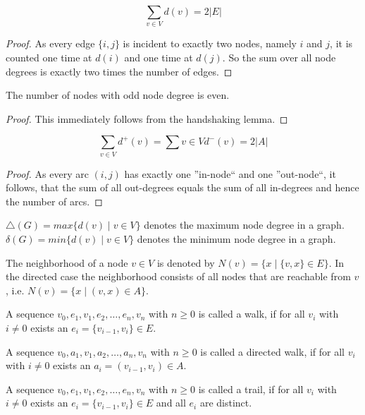 \begin{lemma}
$$\sum_{v \in V}d(v) = 2\left\vert{E}\right\vert$$
\end{lemma}
\begin{proof}
As every edge $\{i, j\}$ is incident to exactly two nodes, namely $i$ and $j$, it is
counted one time at $d(i)$ and one time at $d(j)$. So the sum over all node degrees
is exactly two times the number of edges.
\end{proof}
\begin{corollary}
The number of nodes with odd node degree is even.
\end{corollary}
\begin{proof}
This immediately follows from the handshaking lemma.
\end{proof}
\begin{lemma}
$$\sum_{v\in V}d^+(v)=\sum{v\in V}d^-(v)=2\left\vert{A}\right\vert$$
\end{lemma}
\begin{proof}
As every arc $(i, j)$ has exactly one ”in-node“ and one ”out-node“, it follows,
that the sum of all out-degrees equals the sum of all in-degrees and hence the
number of arcs.
\end{proof}
\begin{definition}
$\triangle (G) = max\{d(v) \mid v \in V \}$ denotes the maximum node degree in a graph. $\delta (G) = min\{d(v) \mid v \in V \}$ denotes the minimum node degree in a graph.
\end{definition}
\begin{definition}
The neighborhood of a node $v \in V$ is denoted by $N(v) = \{x \mid \{v, x\} \in E\}$. In the directed case the neighborhood consists of all nodes that are reachable from $v$, i.e. $N(v) = \{x \mid (v, x) \in A\}$.
\end{definition}
\begin{definition}[Walk]
A sequence $v_0,e_1,v_1,e_2,\ldots ,e_n,v_n$ with $n \geq 0$ is called
a walk, if for all $v_i$ with $i \neq 0$ exists an $e_i = \{v_{i-1} , v_i \} \in E$.
\end{definition}
\begin{definition}
A sequence $v_0,a_1,v_1,a_2,\ldots ,a_n,v_n$ with $n \geq 0$ is called a directed walk, if for all $v_i$ with $i \neq 0$ exists an $a_i = (v_{i-1} , v_i ) \in A$.
\end{definition}
\begin{definition}[Trail]
A sequence $v_0,e_1,v_1,e_2,\dots ,e_n,v_n$ with $n \geq 0$ is called a trail, if for all $v_i$ with $i \neq 0$ exists an $e_i = \{v_{i-1}, v_i\} \in E$ and all $e_i$ are distinct.
\end{definition}
